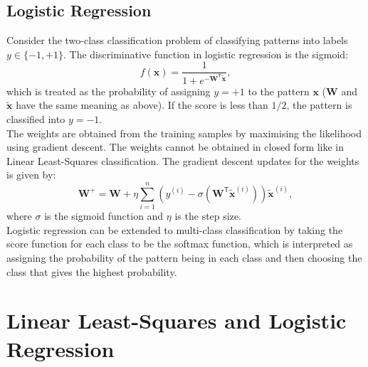 \documentclass[12pt, a4 paper]{article}
\newcommand{\bx}{\mathbf{x}}
\newcommand{\bW}{\mathbf{W}}
\newcommand{\TT}{\mathsf{T}}
\begin{document}

\subsection{Logistic Regression}
\label{subsec:logisticRegression}

Consider the two-class classification problem of classifying patterns into labels $y \in \{-1, +1\}$. The discriminative function in logistic regression is the sigmoid:
\begin{equation}
	f(\bx) = \frac{1}{1+e^{-\bW^{\TT}\tilde{\bx}}},
\label{eq:logisticDiscriminator}
\end{equation}
which is treated as the probability of assigning $y=+1$ to the pattern $\bx$ ($\bW$ and $\tilde{\bx}$ have the same meaning as above). If the score is less than $1/2$, the pattern is classified into $y=-1$. \\

The weights are obtained from the training samples by maximising the likelihood using gradient descent. The weights cannot be obtained in closed form like in Linear Least-Squares classification. The gradient descent updates for the weights is given by:
\begin{equation}
	\bW^{+} = \bW + \eta \sum_{i=1}^{n} \left( y^{(i)} - \sigma(\bW^{\TT}\tilde{\bx}^{(i)}) \right) \tilde{\bx}^{(i)},
\label{eq:logGD}
\end{equation}
where $\sigma$ is the sigmoid function and $\eta$ is the step size. \\

Logistic regression can be extended to multi-class classification by taking the score function for each class to be the softmax function, which is interpreted as assigning the probability of the pattern being in each class and then choosing the class that gives the highest probability.


\section{Linear Least-Squares and Logistic Regression}
\label{sec:LRandLOG}

\label{prob:1.a}
\end{document}
